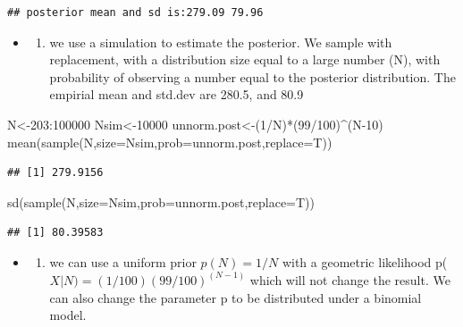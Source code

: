 \documentclass[
]{book}
\newenvironment{Shaded}{\begin{snugshade}}{\end{snugshade}}
\newcommand{\AttributeTok}[1]{\textcolor[rgb]{0.77,0.63,0.00}{#1}}
\newcommand{\DecValTok}[1]{\textcolor[rgb]{0.00,0.00,0.81}{#1}}
\newcommand{\FunctionTok}[1]{\textcolor[rgb]{0.00,0.00,0.00}{#1}}
\newcommand{\NormalTok}[1]{#1}
\newcommand{\OtherTok}[1]{\textcolor[rgb]{0.56,0.35,0.01}{#1}}
\newcommand{\SpecialCharTok}[1]{\textcolor[rgb]{0.00,0.00,0.00}{#1}}
\providecommand{\tightlist}{%
  \setlength{\itemsep}{0pt}\setlength{\parskip}{0pt}}
\theoremstyle{definition}
\theoremstyle{definition}
\theoremstyle{definition}
\theoremstyle{definition}
\theoremstyle{remark}
\begin{document}
\begin{verbatim}
## posterior mean and sd is:279.09 79.96
\end{verbatim}

\begin{itemize}
\item
  \begin{enumerate}
  \def\labelenumi{(\alph{enumi})}
  \setcounter{enumi}{1}
  \tightlist
  \item
    we use a simulation to estimate the posterior. We sample with replacement, with a distribution size equal to a large number (N), with probability of observing a number equal to the posterior distribution. The empirial mean and std.dev are 280.5, and 80.9
  \end{enumerate}
\end{itemize}

\begin{Shaded}
\begin{Highlighting}[]
\NormalTok{ N}\OtherTok{\textless{}{-}}\DecValTok{203}\SpecialCharTok{:}\DecValTok{100000}
\NormalTok{ Nsim}\OtherTok{\textless{}{-}}\DecValTok{10000}
\NormalTok{ unnorm.post}\OtherTok{\textless{}{-}}\NormalTok{(}\DecValTok{1}\SpecialCharTok{/}\NormalTok{N)}\SpecialCharTok{*}\NormalTok{(}\DecValTok{99}\SpecialCharTok{/}\DecValTok{100}\NormalTok{)}\SpecialCharTok{\^{}}\NormalTok{(N}\DecValTok{{-}10}\NormalTok{)}
 \FunctionTok{mean}\NormalTok{(}\FunctionTok{sample}\NormalTok{(N,}\AttributeTok{size=}\NormalTok{Nsim,}\AttributeTok{prob=}\NormalTok{unnorm.post,}\AttributeTok{replace=}\NormalTok{T))}
\end{Highlighting}
\end{Shaded}

\begin{verbatim}
## [1] 279.9156
\end{verbatim}

\begin{Shaded}
\begin{Highlighting}[]
 \FunctionTok{sd}\NormalTok{(}\FunctionTok{sample}\NormalTok{(N,}\AttributeTok{size=}\NormalTok{Nsim,}\AttributeTok{prob=}\NormalTok{unnorm.post,}\AttributeTok{replace=}\NormalTok{T))}
\end{Highlighting}
\end{Shaded}

\begin{verbatim}
## [1] 80.39583
\end{verbatim}

\begin{itemize}
\item
  \begin{enumerate}
  \def\labelenumi{(\alph{enumi})}
  \setcounter{enumi}{2}
  \tightlist
  \item
    we can use a uniform prior \(p(N) = 1/N\) with a geometric likelihood p(\(X|N)=(1/100)(99/100)^(N-1)\) which will not change the result. We can also change the parameter p to be distributed under a binomial model.
  \end{enumerate}
\end{itemize}
\end{document}
